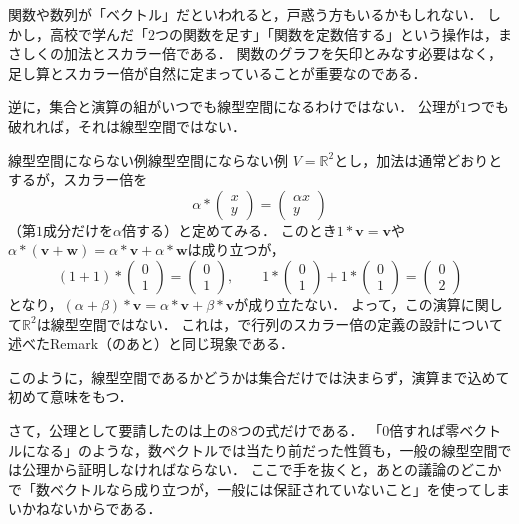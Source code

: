 関数や数列が「ベクトル」だといわれると，戸惑う方もいるかもしれない．
しかし，高校で学んだ「$2$つの関数を足す」「関数を定数倍する」という操作は，まさしくの加法とスカラー倍である．
関数のグラフを矢印とみなす必要はなく，足し算とスカラー倍が自然に定まっていることが重要なのである．

逆に，集合と演算の組がいつでも線型空間になるわけではない．
公理が$1$つでも破れれば，それは線型空間ではない．

\begin{example}{線型空間にならない例}{線型空間にならない例}
  $V=\mathbb{R}^2$とし，加法は通常どおりとするが，スカラー倍を
  \[
    \alpha\ast\begin{pmatrix} x \\ y \end{pmatrix}
    =
    \begin{pmatrix} \alpha x \\ y \end{pmatrix}
  \]
  （第$1$成分だけを$\alpha$倍する）と定めてみる．
  このとき$1\ast\bm{v}=\bm{v}$や$\alpha\ast(\bm{v}+\bm{w})=\alpha\ast\bm{v}+\alpha\ast\bm{w}$は成り立つが，
  \[
    (1+1)\ast\begin{pmatrix} 0 \\ 1 \end{pmatrix}
    =\begin{pmatrix} 0 \\ 1 \end{pmatrix},
    \qquad
    1\ast\begin{pmatrix} 0 \\ 1 \end{pmatrix}
    +1\ast\begin{pmatrix} 0 \\ 1 \end{pmatrix}
    =\begin{pmatrix} 0 \\ 2 \end{pmatrix}
  \]
  となり，$(\alpha+\beta)\ast\bm{v}=\alpha\ast\bm{v}+\beta\ast\bm{v}$が成り立たない．
  よって，この演算に関して$\mathbb{R}^2$は線型空間ではない．
  これは，で行列のスカラー倍の定義の設計について述べたRemark（のあと）と同じ現象である．
\end{example}

このように，線型空間であるかどうかは集合だけでは決まらず，演算まで込めて初めて意味をもつ．

さて，公理として要請したのは上の$8$つの式だけである．
「$0$倍すれば零ベクトルになる」のような，数ベクトルでは当たり前だった性質も，一般の線型空間では公理から証明しなければならない．
ここで手を抜くと，あとの議論のどこかで「数ベクトルなら成り立つが，一般には保証されていないこと」を使ってしまいかねないからである．

